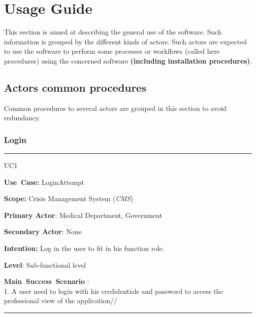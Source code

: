\chapter{Usage Guide}
\label{chap:usage_guide}

This section is aimed at describing the general use of the software. Such
information is grouped by the different kinds of actors.
Such actors are expected to use the software to perform some
processes or workflows (called here procedures) using the concerned software
\textbf{(including installation procedures)}.

\section{Actors common procedures}
Common procedures to several actors are grouped in this section to avoid
redundancy.

\subsection{Login}
\vspace{0.5cm}
\hrule
\vspace{0.5cm}
\begin{lyxlist}{UC1}
\small{
\item [\textbf{Use~Case:}] LoginAttempt
\item [\textbf{Scope:}] Crisis Management System (\emph{CMS})
\item [\textbf{Primary Actor}:] Medical Department, Government
\item [\textbf{Secondary Actor}:] None
\item [\textbf{Intention:}] Log in the user to fit in his function role.
\item [\textbf{Level}:]Sub-functional level
\item [\textbf{Main~Success~Scenario}]:\\
1. A user need to login with his credidentials and password to access the
professional view of the application// 
}
\end{lyxlist}
\hrule 
\vspace{0.5cm} 

